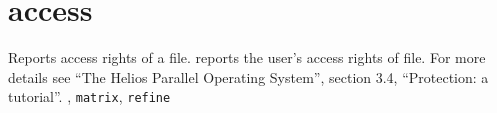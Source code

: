 \section{access}
\begin{man}
  \PP Reports access rights of a file.
   reports the user's access rights of file. For more details
      see ``The Helios Parallel Operating System'', section 3.4,
      ``Protection: a tutorial''.
  , {\tt matrix}, {\tt refine}
\end{man}
